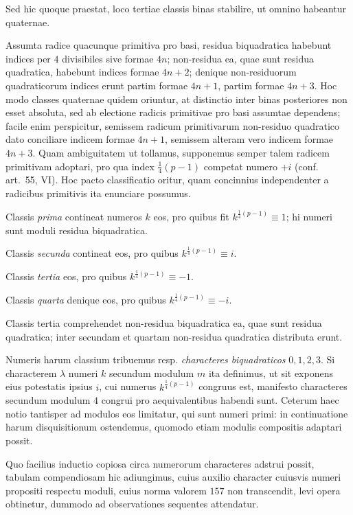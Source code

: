 %
Sed hic quoque praestat, loco tertiae classis binas stabilire, ut omnino habeantur quaternae.

Assumta radice quacunque primitiva pro basi, residua biquadratica habebunt indices per $4$ divisibiles sive formae $4n$; non-residua ea, quae sunt residua quadratica, habebunt indices formae $4n+2$; denique non-residuorum quadraticorum indices erunt partim formae $4n+1$, partim formae $4n+3$. Hoc modo classes quaternae quidem oriuntur, at distinctio inter binas posteriores non esset absoluta, sed ab electione radicis primitivae pro basi assumtae dependens; facile enim perspicitur, semissem radicum primitivarum non-residuo quadratico dato conciliare indicem formae $4n+1$, semissem alteram vero indicem formae $4n+3$. Quam ambiguitatem ut tollamus, supponemus semper talem radicem primitivam adoptari, pro qua index $\frac14(p-1)$ competat numero $+i$ (conf. art.~55, VI). Hoc pacto classificatio oritur, quam concinnius independenter a radicibus primitivis ita enunciare possumus.

Classis \emph{prima} contineat numeros $k$ eos, pro quibus fit $k^{\frac14(p-1)}\equiv1$; hi numeri sunt moduli residua biquadratica.

Classis \emph{secunda} contineat eos, pro quibus $k^{\frac14(p-1)}\equiv i$.

Classis \emph{tertia} eos, pro quibus $k^{\frac14(p-1)}\equiv-1$.

Classis \emph{quarta} denique eos, pro quibus $k^{\frac14(p-1)}\equiv-i$.

Classis tertia comprehendet non-residua biquadratica ea, quae sunt residua quadratica; inter secundam et quartam non-residua quadratica distributa erunt.

Numeris harum classium tribuemus resp. \emph{characteres biquadraticos} $0,1,2,3$. Si characterem $\lambda$ numeri $k$ secundum modulum $m$ ita definimus, ut sit exponens eius potestatis ipsius $i$, cui numerus $k^{\frac14(p-1)}$ congruus est, manifesto characteres secundum modulum $4$ congrui pro aequivalentibus habendi sunt. Ceterum haec notio tantisper ad modulos eos limitatur, qui sunt numeri primi: in continuatione harum disquisitionum ostendemus, quomodo etiam modulis compositis adaptari possit.

Quo facilius inductio copiosa circa numerorum characteres adstrui possit, tabulam compendiosam hic adiungimus, cuius auxilio character cuiusvis numeri propositi respectu moduli, cuius norma valorem $157$ non transcendit, levi opera obtinetur, dummodo ad observationes sequentes attendatur.

